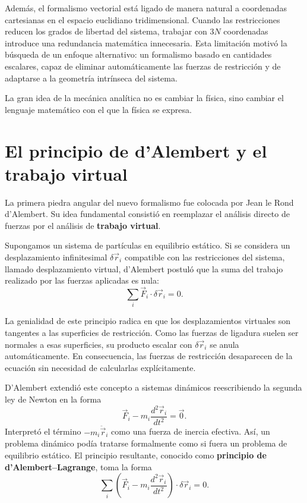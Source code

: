 Además, el formalismo vectorial está ligado de manera natural a coordenadas cartesianas en el espacio euclidiano tridimensional. Cuando las restricciones reducen los grados de libertad del sistema, trabajar con \(3N\) coordenadas introduce una redundancia matemática innecesaria. Esta limitación motivó la búsqueda de un enfoque alternativo: un formalismo basado en cantidades escalares, capaz de eliminar automáticamente las fuerzas de restricción y de adaptarse a la geometría intrínseca del sistema.

\begin{importante}
La gran idea de la mecánica analítica no es cambiar la física, sino cambiar el lenguaje matemático con el que la física se expresa.
\end{importante}

\section{El principio de d'Alembert y el trabajo virtual}
La primera piedra angular del nuevo formalismo fue colocada por Jean le Rond d'Alembert. Su idea fundamental consistió en reemplazar el análisis directo de fuerzas por el análisis de \textbf{trabajo virtual}.

Supongamos un sistema de partículas en equilibrio estático. Si se considera un desplazamiento infinitesimal \(\delta\vec{r}_i\) compatible con las restricciones del sistema, llamado desplazamiento virtual, d'Alembert postuló que la suma del trabajo realizado por las fuerzas aplicadas es nula:
\[
 \sum_i \vec{F}_i \cdot \delta\vec{r}_i = 0.
\]

La genialidad de este principio radica en que los desplazamientos virtuales son tangentes a las superficies de restricción. Como las fuerzas de ligadura suelen ser normales a esas superficies, su producto escalar con \(\delta\vec{r}_i\) se anula automáticamente. En consecuencia, las fuerzas de restricción desaparecen de la ecuación sin necesidad de calcularlas explícitamente.

D'Alembert extendió este concepto a sistemas dinámicos reescribiendo la segunda ley de Newton en la forma
\[
 \vec{F}_i - m_i \frac{d^2\vec{r}_i}{dt^2} = \vec{0}.
\]
Interpretó el término \(-m_i\ddot{\vec{r}}_i\) como una fuerza de inercia efectiva. Así, un problema dinámico podía tratarse formalmente como si fuera un problema de equilibrio estático. El principio resultante, conocido como \textbf{principio de d'Alembert--Lagrange}, toma la forma
\[
 \sum_i \left(\vec{F}_i - m_i\frac{d^2\vec{r}_i}{dt^2}\right) \cdot \delta\vec{r}_i = 0.
\]

